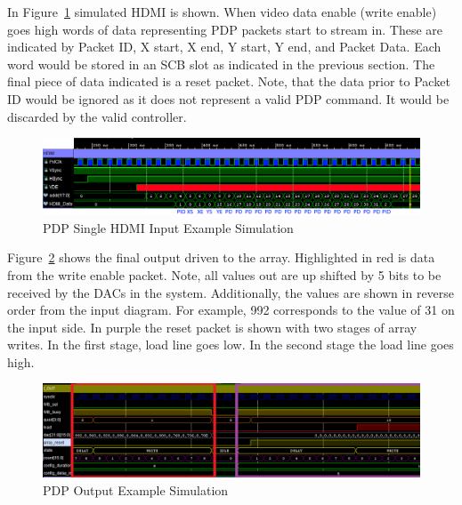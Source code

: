 In Figure~\ref{fig:input_example} simulated HDMI is shown. When video data enable (write enable) goes high words of data representing PDP packets start to stream in. These are indicated by Packet ID, X start, X end, Y start, Y end, and Packet Data. Each word would be stored in an SCB slot as indicated in the previous section. The final piece of data indicated is a reset packet. Note, that the data prior to Packet ID would be ignored as it does not represent a valid PDP command. It would be discarded by the valid controller.

\begin{figure}
    \centering
    \includegraphics[width=1.0\textwidth]{fig/pdp_input_example.png}
    \caption{PDP Single HDMI Input Example Simulation}
    \label{fig:input_example}
\end{figure}

Figure~\ref{fig:output_example} shows the final output driven to the array. Highlighted in red is data from the write enable packet. Note, all values out are up shifted by 5 bits to be received by the DACs in the system. Additionally, the values are shown in reverse order from the input diagram. For example, 992 corresponds to the value of 31 on the input side. In purple the reset packet is shown with two stages of array writes. In the first stage, load line goes low. In the second stage the load line goes high.

\begin{figure}
    \centering
    \includegraphics[width=1.0\textwidth]{fig/pdp_output_example.png}
    \caption{PDP Output Example Simulation}
    \label{fig:output_example}
\end{figure}
